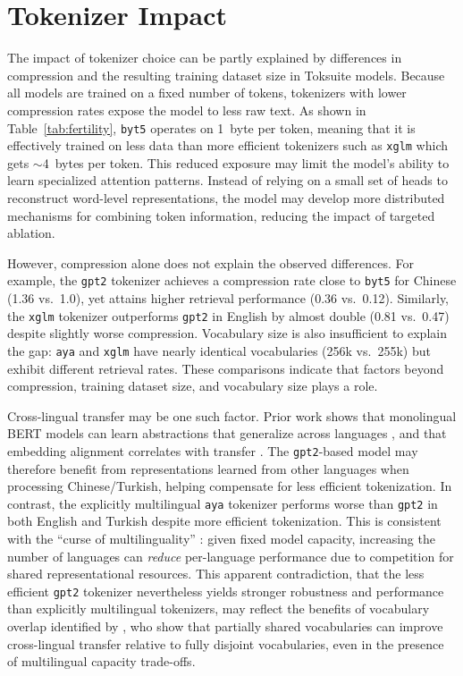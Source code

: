 \section{Tokenizer Impact}\label{sec:discussion_tokenizer}

The impact of tokenizer choice can be partly explained by differences in compression and the resulting training dataset size in Toksuite models. Because all models are trained on a fixed number of tokens, tokenizers with lower compression rates expose the model to less raw text. As shown in Table~\ref{tab:fertility}, \texttt{byt5} operates on 1~byte per token, meaning that it is effectively trained on less data than more efficient tokenizers such as \texttt{xglm} which gets $\sim$4~bytes per token. This reduced exposure may limit the model's ability to learn specialized attention patterns. Instead of relying on a small set of heads to reconstruct word-level representations, the model may develop more distributed mechanisms for combining token information, reducing the impact of targeted ablation.

However, compression alone does not explain the observed differences. For example, the \texttt{gpt2} tokenizer achieves a compression rate close to \texttt{byt5} for Chinese (1.36 vs.\ 1.0), yet attains higher retrieval performance (0.36 vs.\ 0.12). Similarly, the \texttt{xglm} tokenizer outperforms \texttt{gpt2} in English by almost double (0.81 vs.\ 0.47) despite slightly worse compression. Vocabulary size is also insufficient to explain the gap: \texttt{aya} and \texttt{xglm} have nearly identical vocabularies (256k vs.\ 255k) but exhibit different retrieval rates. These comparisons indicate that factors beyond compression, training dataset size, and vocabulary size plays a role.

Cross-lingual transfer may be one such factor. Prior work shows that monolingual BERT models can learn abstractions that generalize across languages \citep{artetxe2020}, and that embedding alignment correlates with transfer \citep{deshpande2022}. The \texttt{gpt2}-based model may therefore benefit from representations learned from other languages when processing Chinese/Turkish, helping compensate for less efficient tokenization. In contrast, the explicitly multilingual \texttt{aya} tokenizer performs worse than \texttt{gpt2} in both English and Turkish despite more efficient tokenization. This is consistent with the ``curse of multilinguality'' \citep{chang2024}: given fixed model capacity, increasing the number of languages can \textit{reduce} per-language performance due to competition for shared representational resources. This apparent contradiction, that the less efficient \texttt{gpt2} tokenizer nevertheless yields stronger robustness and performance than explicitly multilingual tokenizers, may reflect the benefits of vocabulary overlap identified by \cite{kallini2025}, who show that partially shared vocabularies can improve cross-lingual transfer relative to fully disjoint vocabularies, even in the presence of multilingual capacity trade-offs.

